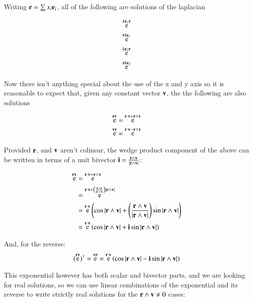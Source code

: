 \documentclass{article}      %
\DeclareMathOperator{\Exp}{e}
\begin{document}
Writing $\mathbf{r} = \sum x_i \mathbf{e}_i$, all of the following are solutions
of the laplacian

\begin{align*}
\Exp^{k\Be_1\Br} \\
\Exp^{\Br k\Be_1} \\
\Exp^{k\Be_2\Br} \\
\Exp^{\Br k\Be_2} \\
\end{align*}

Now there isn't anything special about the use of the x and y axis so it is reasonable to expect that, given any constant vector $\mathbf{v}$, 
the the following are also solutions

\begin{align*}
\Exp^{\Br\Bv} &= \Exp^{\Br \cdot \Bv + \Br \wedge \Bv} \\
\Exp^{\Bv\Br} &= \Exp^{\Br \cdot \Bv - \Br \wedge \Bv} \\
\end{align*}

Provided $\mathbf{r}$, and $\mathbf{v}$ aren't colinear, the wedge product component of the above can be written in terms of a unit bivector
$\mathbf{i} = \frac{\mathbf{r} \wedge \mathbf{v}}{\lvert{\mathbf{r}\wedge \mathbf{v}}\rvert}$:

\begin{align*}
\Exp^{\Br\Bv} &= \Exp^{\Br \cdot \Bv + \Br \wedge \Bv} \\
&= \Exp^{\Br \cdot \Bv + \left( \frac{\Br \wedge \Bv}{\abs{\Br \wedge \Bv}} \right) {\abs{\Br \wedge \Bv}}} \\
&= \Exp^{\Br \cdot \Bv} \left( \cos{\abs{\Br \wedge \Bv}} + \left(\frac{\Br \wedge \Bv}{\abs{\Br \wedge \Bv}}\right) \sin{\abs{\Br \wedge \Bv}} \right) \\
&= \Exp^{\Br \cdot \Bv} \left( \cos{\abs{\Br \wedge \Bv}} + \Bi \sin{\abs{\Br \wedge \Bv}} \right) \\
\end{align*}

And, for the reverse:
\begin{align*}
(\Exp^{\Br\Bv})^\dagger = \Exp^{\Bv\Br}
&= \Exp^{\Br \cdot \Bv} \left( \cos{\abs{\Br \wedge \Bv}} - \Bi \sin{\abs{\Br \wedge \Bv}} \right) \\
\end{align*}

This exponential however has both scalar and bivector parts, and we are looking for real solutions, so we can use linear combinations of the
exponential and its reverse 
to write strictly real solutions for the $\mathbf{r} \wedge \mathbf{v} \ne 0$ cases:
\end{document}
